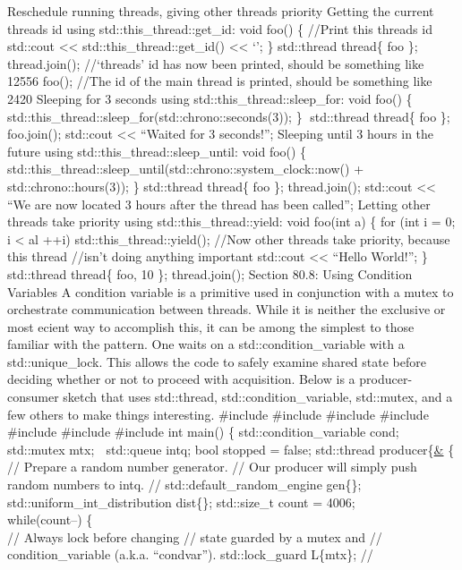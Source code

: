 Reschedule running threads, giving other threads priority Getting the
current threads id using std::this\_thread::get\_id: void foo() \{
//Print this threads id std::cout \textless\textless{}
std::this\_thread::get\_id() \textless\textless{} `\n'; \} std::thread
thread\{ foo \}; thread.join(); //`threads' id has now been printed,
should be something like 12556 foo(); //The id of the main thread is
printed, should be something like 2420 Sleeping for 3 seconds using
std::this\_thread::sleep\_for: void foo() \{
std::this\_thread::sleep\_for(std::chrono::seconds(3)); \} std::thread
thread\{ foo \}; foo.join(); std::cout \textless\textless{} ``Waited for
3 seconds!\n''; Sleeping until 3 hours in the future using
std::this\_thread::sleep\_until: void foo() \{
std::this\_thread::sleep\_until(std::chrono::system\_clock::now() +
std::chrono::hours(3)); \} std::thread thread\{ foo \}; thread.join();
std::cout \textless\textless{} ``We are now located 3 hours after the
thread has been called\n''; Letting other threads take priority using
std::this\_thread::yield: void foo(int a) \{ for (int i = 0; i
\textless{} al ++i) std::this\_thread::yield(); //Now other threads take
priority, because this thread //isn't doing anything important std::cout
\textless\textless{} ``Hello World!\n''; \} std::thread thread\{ foo, 10
\}; thread.join(); Section 80.8: Using Condition Variables A condition
variable is a primitive used in conjunction with a mutex to orchestrate
communication between threads. While it is neither the exclusive or most
ecient way to accomplish this, it can be among the simplest to those
familiar with the pattern. One waits on a std::condition\_variable with
a std::unique\_lock. This allows the code to safely examine shared state
before deciding whether or not to proceed with acquisition. Below is a
producer-consumer sketch that uses std::thread,
std::condition\_variable, std::mutex, and a few others to make things
interesting. \#include \#include \#include \#include \#include \#include
\#include int main() \{ std::condition\_variable cond; std::mutex mtx; 
std::queue intq; bool stopped = false; std::thread producer\{\href{}{\&}
\{ // Prepare a random number generator. // Our producer will simply
push random numbers to intq. // std::default\_random\_engine gen\{\};
std::uniform\_int\_distribution dist\{\}; std::size\_t count = 4006;\\
while(count--) \{\\
// Always lock before changing // state guarded by a mutex and //
condition\_variable (a.k.a. ``condvar''). std::lock\_guard L\{mtx\}; //
